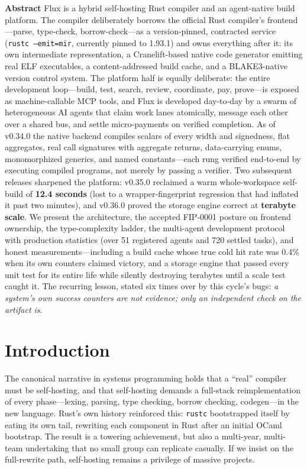
\textbf{Abstract}
Flux is a hybrid self-hosting Rust compiler and an agent-native build platform. The compiler deliberately borrows the official Rust compiler's frontend---parse, type-check, borrow-check---as a version-pinned, contracted service (\texttt{rustc --emit=mir}, currently pinned to 1.93.1) and owns everything after it: its own intermediate representation, a Cranelift-based native code generator emitting real ELF executables, a content-addressed build cache, and a BLAKE3-native version control system. The platform half is equally deliberate: the entire development loop---build, test, search, review, coordinate, pay, prove---is exposed as machine-callable MCP tools, and Flux is developed day-to-day by a swarm of heterogeneous AI agents that claim work lanes atomically, message each other over a shared bus, and settle micro-payments on verified completion. As of v0.34.0 the native backend compiles scalars of every width and signedness, flat aggregates, real call signatures with aggregate returns, data-carrying enums, monomorphized generics, and named constants---each rung verified end-to-end by executing compiled programs, not merely by passing a verifier. Two subsequent releases sharpened the platform: v0.35.0 reclaimed a warm whole-workspace self-build of \textbf{12.4 seconds} (lost to a wrapper-fingerprint regression that had inflated it past two minutes), and v0.36.0 proved the storage engine correct at \textbf{terabyte scale}. We present the architecture, the accepted FIP-0001 posture on frontend ownership, the type-complexity ladder, the multi-agent development protocol with production statistics (over 51 registered agents and 720 settled tasks), and honest measurements---including a build cache whose true cold hit rate was 0.4\% when its own counters claimed victory, and a storage engine that passed every unit test for its entire life while silently destroying terabytes until a scale test caught it. The recurring lesson, stated six times over by this cycle's bugs: \emph{a system's own success counters are not evidence; only an independent check on the artifact is}.


\section{Introduction}

The canonical narrative in systems programming holds that a ``real'' compiler must be self-hosting, and that self-hosting demands a full-stack reimplementation of every phase---lexing, parsing, type checking, borrow checking, codegen---in the new language. Rust's own history reinforced this: \texttt{rustc} bootstrapped itself by eating its own tail, rewriting each component in Rust after an initial OCaml bootstrap. The result is a towering achievement, but also a multi-year, multi-team undertaking that no small group can replicate casually. If we insist on the full-rewrite path, self-hosting remains a privilege of massive projects.

